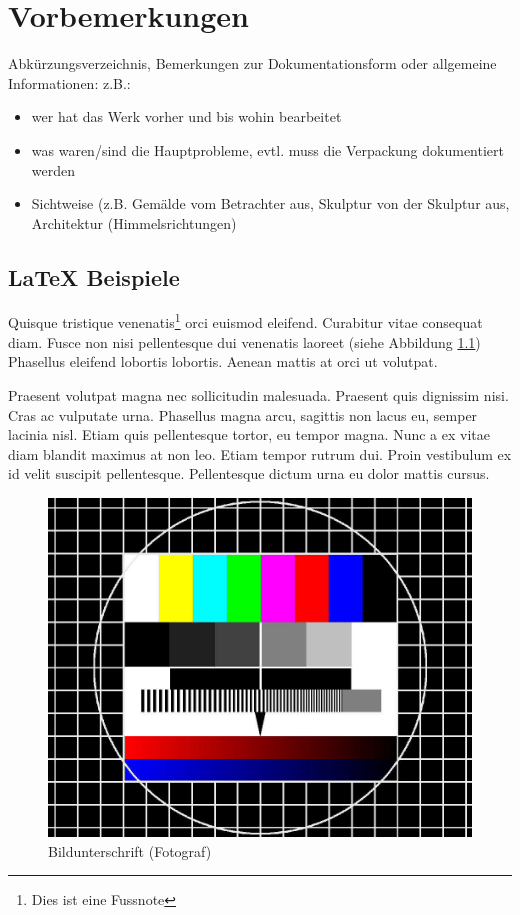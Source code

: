 
\chapter{Vorbemerkungen}
\label{chap:vorbemerkungen}

Abkürzungsverzeichnis, Bemerkungen zur Dokumentationsform oder allgemeine Informationen: z.B.: 

\begin{itemize}
	\item wer hat das Werk vorher und bis wohin bearbeitet
	\item was waren/sind die Hauptprobleme, evtl. muss die Verpackung dokumentiert werden
	\item Sichtweise (z.B. Gemälde vom Betrachter aus, Skulptur von der Skulptur aus, Architektur (Himmelsrichtungen)
\end{itemize}


\section{LaTeX Beispiele}

Quisque tristique venenatis\footnote{Dies ist eine Fussnote} orci euismod eleifend. Curabitur vitae consequat diam. Fusce non nisi pellentesque dui venenatis laoreet (siehe Abbildung \ref{fig:testbild}) Phasellus eleifend lobortis lobortis. Aenean mattis at orci ut volutpat. \autocite[S. 55]{laurencew.mckeenEffectUVLight2019}


Praesent volutpat magna nec sollicitudin malesuada. Praesent quis dignissim nisi. Cras ac vulputate urna. Phasellus magna arcu, sagittis non lacus eu, semper lacinia nisl. Etiam quis pellentesque tortor, eu tempor magna. Nunc a ex vitae diam blandit maximus at non leo. Etiam tempor rutrum dui. Proin vestibulum ex id velit suscipit pellentesque. Pellentesque dictum urna eu dolor mattis cursus.




\bigskip

\begin{figure}[h]
	\centering
	\captionsetup{margin=2.4cm} %
	\includegraphics[width=0.7
	\linewidth]{bilder/identifikation/testbild}
	\caption{Bildunterschrift (Fotograf)}
	\label{fig:testbild}
\end{figure}


